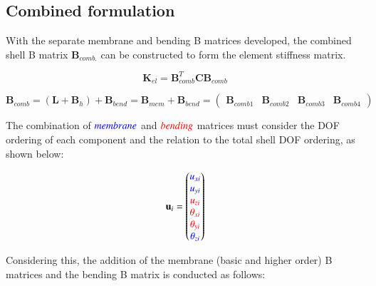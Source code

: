 \subsection{Combined formulation}

With the separate membrane and bending B matrices developed, the combined shell B matrix $\textbf{B}_{comb.}$ can be constructed to form the element stiffness matrix.

\begin{equation} 
\textbf{K}_{el} = \textbf{B}_{comb}^T \textbf{C} \textbf{B}_{comb} 
\label{equation30}
\end{equation}

\begin{equation} 
\textbf{B}_{comb} = (\mathbf{L} + \mathbf{B}_h) + \mathbf{B}_{bend} = \mathbf{B}_{mem} + \mathbf{B}_{bend} = 
\begin{pmatrix}
\mathbf{B}_{comb1} & \mathbf{B}_{comb2} & \mathbf{B}_{comb3} & \mathbf{B}_{comb4}
\end{pmatrix}
\label{equation31}
\end{equation}

The combination of $\textcolor{blue}{membrane}$ and $\textcolor{red}{bending}$ matrices must consider the DOF ordering of each component and the relation to the total shell DOF ordering, as shown below:

\begin{equation} 
\mathbf{u}_i = 
\begin{pmatrix}
\textcolor{blue}{u_{xi}} \\ 
\textcolor{blue}{u_{yi}} \\ 
\textcolor{red}{u_{zi}} \\ 
\textcolor{red}{\theta_{xi}} \\ 
\textcolor{red}{\theta_{yi}} \\ 
\textcolor{blue}{\theta_{zi}} \\ 
\end{pmatrix}
\label{equation32}
\end{equation}

Considering this, the addition of the membrane (basic and higher order) B matrices and the bending B matrix is conducted as follows:

